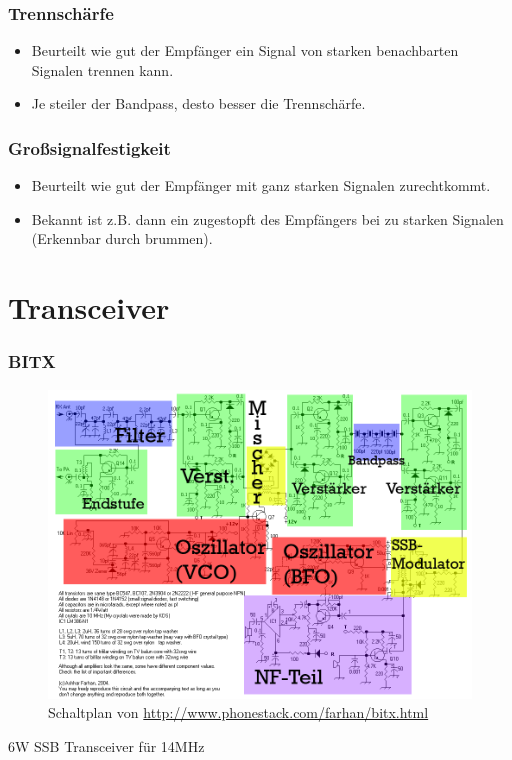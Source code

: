 \begin{frame}
  \frametitle{Trennschärfe}
  \begin{itemize}
    \item Beurteilt wie gut der Empfänger ein Signal von starken benachbarten Signalen trennen kann.
    \item Je steiler der Bandpass, desto besser die Trennschärfe.
  \end{itemize}
\end{frame}

\begin{frame}
  \frametitle{Großsignalfestigkeit}
  \begin{itemize}
    \item Beurteilt wie gut der Empfänger mit ganz starken Signalen zurechtkommt.
    \item Bekannt ist z.B. dann ein zugestopft des Empfängers bei zu starken Signalen (Erkennbar durch brummen).
  \end{itemize}
\end{frame}

\section*{Transceiver}

\begin{frame}
  \frametitle{BITX}
  \begin{figure}
    \includegraphics[width=.95\textwidth,height=.75\textheight,keepaspectratio]{e15/bitx-farbe.png}
      \caption{Schaltplan von \ExternalLink\url{http://www.phonestack.com/farhan/bitx.html}}
  \end{figure}
  6W SSB Transceiver für 14MHz
\end{frame}

